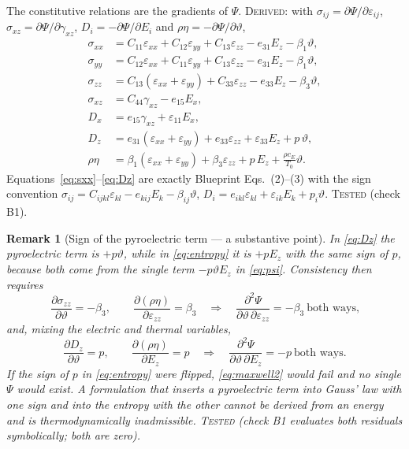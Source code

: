 \documentclass[11pt]{article}
\newcommand{\s}{\sigma}
\newcommand{\eps}{\varepsilon}
\newcommand{\bth}{\vartheta}
\theoremstyle{plain}
\newtheorem{remark}{Remark}
\begin{document}
The constitutive relations are the gradients of $\Psi$. \textsc{Derived}: with
$\s_{ij} = \partial\Psi/\partial\eps_{ij}$,
$\s_{xz} = \partial\Psi/\partial\gamma_{xz}$,
$D_i = -\partial\Psi/\partial E_i$ and $\rho\eta = -\partial\Psi/\partial\bth$,
\begin{align}
  \s_{xx} &= C_{11}\eps_{xx} + C_{12}\eps_{yy} + C_{13}\eps_{zz}
            - e_{31}E_z - \beta_1\bth, \label{eq:sxx}\\
  \s_{yy} &= C_{12}\eps_{xx} + C_{11}\eps_{yy} + C_{13}\eps_{zz}
            - e_{31}E_z - \beta_1\bth, \label{eq:syy}\\
  \s_{zz} &= C_{13}(\eps_{xx}+\eps_{yy}) + C_{33}\eps_{zz}
            - e_{33}E_z - \beta_3\bth, \label{eq:szz}\\
  \s_{xz} &= C_{44}\gamma_{xz} - e_{15}E_x, \label{eq:sxz}\\
  D_x &= e_{15}\gamma_{xz} + \eps_{11}E_x, \label{eq:Dx}\\
  D_z &= e_{31}(\eps_{xx}+\eps_{yy}) + e_{33}\eps_{zz} + \eps_{33}E_z + p\,\bth,
  \label{eq:Dz}\\
  \rho\eta &= \beta_1(\eps_{xx}+\eps_{yy}) + \beta_3\eps_{zz} + p\,E_z
             + \frac{\rho c_E}{T_0}\bth .
  \label{eq:entropy}
\end{align}
Equations~\eqref{eq:sxx}--\eqref{eq:Dz} are exactly Blueprint Eqs.~(2)--(3) with
the sign convention $\s_{ij}=C_{ijkl}\eps_{kl}-e_{kij}E_k-\beta_{ij}\bth$,
$D_i=e_{ikl}\eps_{kl}+\eps_{ik}E_k+p_i\bth$. \textsc{Tested} (check B1).

\begin{remark}[Sign of the pyroelectric term --- a substantive point]
\label{rem:pyro}
In \eqref{eq:Dz} the pyroelectric term is $+p\bth$, while in
\eqref{eq:entropy} it is $+pE_z$ with the \emph{same} sign of $p$, because both
come from the single term $-p\bth E_z$ in \eqref{eq:psi}. Consistency then
requires
\begin{equation}
  \frac{\partial \s_{zz}}{\partial \bth} = -\beta_3,
  \qquad
  \frac{\partial(\rho\eta)}{\partial\eps_{zz}} = \beta_3
  \quad\Longrightarrow\quad
  \frac{\partial^2\Psi}{\partial\bth\,\partial\eps_{zz}} = -\beta_3
  \ \text{both ways,}
  \label{eq:maxwell1}
\end{equation}
and, mixing the electric and thermal variables,
\begin{equation}
  \frac{\partial D_z}{\partial \bth} = p,
  \qquad
  \frac{\partial(\rho\eta)}{\partial E_z} = p
  \quad\Longrightarrow\quad
  \frac{\partial^2\Psi}{\partial\bth\,\partial E_z} = -p \ \text{both ways.}
  \label{eq:maxwell2}
\end{equation}
If the sign of $p$ in \eqref{eq:entropy} were flipped, \eqref{eq:maxwell2} would
fail and no single $\Psi$ would exist. A formulation that inserts a pyroelectric
term into Gauss' law with one sign and into the entropy with the other cannot be
derived from an energy and is thermodynamically inadmissible.
\textsc{Tested} (check B1 evaluates both residuals symbolically; both are zero).
\end{remark}
\end{document}

